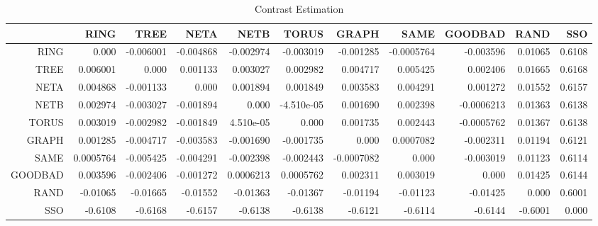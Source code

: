 \documentclass[a4paper,10pt]{article}
\begin{document}
\begin{landscape}
\begin{table}[!htp]
\centering\tiny
\caption{Contrast Estimation}
\begin{tabular}{
|r|r|r|r|r|r|r|r|r|r|r|}
\hline
 & RING& TREE& NETA& NETB& TORUS& GRAPH& SAME& GOODBAD& RAND& SSO\\
\hline
 RING&0.000&-0.006001&-0.004868&-0.002974&-0.003019&-0.001285&-0.0005764&-0.003596&0.01065&0.6108\\
\hline
 TREE&0.006001&0.000&0.001133&0.003027&0.002982&0.004717&0.005425&0.002406&0.01665&0.6168\\
\hline
 NETA&0.004868&-0.001133&0.000&0.001894&0.001849&0.003583&0.004291&0.001272&0.01552&0.6157\\
\hline
 NETB&0.002974&-0.003027&-0.001894&0.000&-4.510e-05&0.001690&0.002398&-0.0006213&0.01363&0.6138\\
\hline
 TORUS&0.003019&-0.002982&-0.001849&4.510e-05&0.000&0.001735&0.002443&-0.0005762&0.01367&0.6138\\
\hline
 GRAPH&0.001285&-0.004717&-0.003583&-0.001690&-0.001735&0.000&0.0007082&-0.002311&0.01194&0.6121\\
\hline
 SAME&0.0005764&-0.005425&-0.004291&-0.002398&-0.002443&-0.0007082&0.000&-0.003019&0.01123&0.6114\\
\hline
 GOODBAD&0.003596&-0.002406&-0.001272&0.0006213&0.0005762&0.002311&0.003019&0.000&0.01425&0.6144\\
\hline
 RAND&-0.01065&-0.01665&-0.01552&-0.01363&-0.01367&-0.01194&-0.01123&-0.01425&0.000&0.6001\\
\hline
 SSO&-0.6108&-0.6168&-0.6157&-0.6138&-0.6138&-0.6121&-0.6114&-0.6144&-0.6001&0.000\\
\hline

\end{tabular}
\end{table}

\newpage


\end{landscape}
\end{document}
